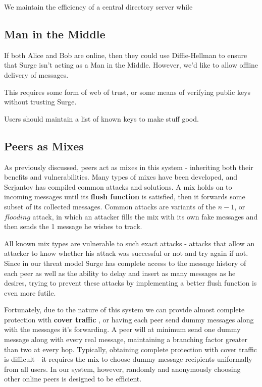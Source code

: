 \documentclass[twocolumn,11pt,english]{article}
\begin{document}
We maintain the efficiency of a central directory server while 

\subsection{Man in the Middle} If both Alice and Bob are online, then they could use Diffie-Hellman to ensure that Surge isn't acting as a Man in the Middle. However, we'd like to allow offline delivery of messages.

This requires some form of web of trust, or some means of verifying public keys without trusting Surge. 

Users should maintain a list of known keys to make stuff good. 

\subsection{Peers as Mixes}
As previously discussed, peers act as mixes in this system - inheriting both their benefits and vulnerabilities. Many types of mixes have been developed, and Serjantov \cite{trickle02} has compiled common attacks and solutions. 
A mix holds on to incoming messages until its \textbf{flush function} is satisfied, then it forwards some subset of its collected messages. Common attacks are variants of the $n - 1$, or $flooding$ attack, in which an attacker fills the mix with its own fake messages and then sends the 1 message he wishes to track. 

All known mix types are vulnerable to such exact attacks \cite{trickle02} -  attacks that allow an attacker to know whether his attack was successful or not and try again if not. Since in our threat model Surge has complete access to the message history of each peer as well as the ability to delay and insert as many messages as he desires, trying to prevent these attacks by implementing a better flush function is even more futile. 

Fortunately, due to the nature of this system we can provide almost complete protection with \textbf{cover traffic} \cite{trickle02}, or having each peer send dummy messages along with the messages it's forwarding. A peer will at minimum send one dummy message along with every real message, maintaining a branching factor greater than two at every hop. Typically, obtaining complete protection with cover traffic is difficult - it requires the mix to choose dummy message recipients uniformally from all users\cite{trickle02}. In our system, however, randomly and anonymously choosing other online peers is designed to be efficient.
\end{document}
